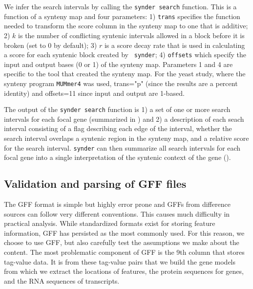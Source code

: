 We infer the search intervals by calling the {\tt synder search} function. This
is a function of a synteny map and four parameters: 1) {\tt trans} specifies the
function needed to transform the score column in the synteny map to one that is
additive; 2) $k$ is the number of conflicting syntenic intervals allowed in a
block before it is broken (set to 0 by default); 3) $r$ is a score decay rate
that is used in calculating a score for each syntenic block created by {\tt
synder}; 4) {\tt offsets} which specify the input and output bases (0 or 1) of
the synteny map. Parameters 1 and 4 are specific to the tool that created the
synteny map. For the yeast study, where the synteny program {\tt MUMmer4} was used,
trans="p" (since the results are a percent identity) and offsets=11 since input
and output are 1-based.

The output of the {\tt synder search} function is 1) a set of one or more
search intervals for each focal gene (summarized in
) and 2) a description of each seach interval
consisting of a flag describing each edge of the interval, whether the search
interval overlaps a syntenic region in the synteny map, and a relative score
for the search interval. {\tt synder} can then summarize all search intervals
for each focal gene into a single interpretation of the syntenic context of the
gene ().  

\subsection{Validation and parsing of GFF files}\label{subsec:cleaning-gffs}

The GFF format is simple but highly error prone and GFFs from difference
sources can follow very different conventions. This causes much difficulty in
practical analysis. While standardized formats exist for storing feature
information, GFF has persisted as the most commonly used. For this reason, we
choose to use GFF, but also carefully test the assumptions we make about the
content. The most problematic component of GFF is the 9th column that stores
tag-value data. It is from these tag-value pairs that we build the gene models
from which we extract the locations of features, the protein sequences for
genes, and the RNA sequences of transcripts.

